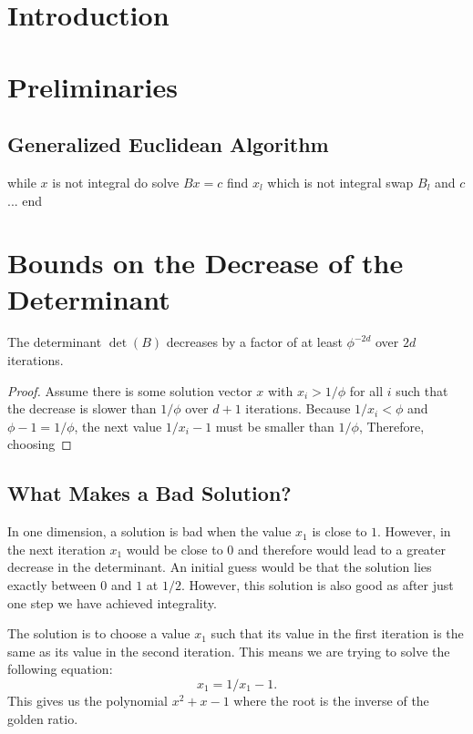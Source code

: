 \documentclass[english,version-2020-11]{uzl-thesis}
\begin{document}
\chapter{Introduction}

\chapter{Preliminaries}

\section{Generalized Euclidean Algorithm}

\begin{Pseudocode}
while $x$ is not integral do
  solve $Bx = c$
  find $x_l$ which is not integral
  swap $B_l$ and $c$
  ...
end
\end{Pseudocode}

\chapter{Bounds on the Decrease of the Determinant}

\begin{theorem}
  The determinant $\det(B)$ decreases by a factor of at least $\phi^{-2d}$ over
  $2d$ iterations.
\end{theorem}

\begin{proof}
  Assume there is some solution vector $x$ with $x_i > 1/\phi$ for all $i$
  such that the decrease is slower than $1/\phi$ over $d+1$ iterations.
  Because $1/x_i < \phi$ and $\phi - 1 = 1/\phi$,
  the next value $1/x_i - 1$ must be smaller than $1/\phi$,
  Therefore, choosing
\end{proof}

\section{What Makes a Bad Solution?}

In one dimension, a solution is bad when the value $x_1$ is close to $1$.
However, in the next iteration $x_1$ would be close to $0$ and therefore
would lead to a greater decrease in the determinant.
An initial guess would be that the solution lies exactly between $0$ and $1$ at $1/2$.
However, this solution is also good as after just one step we have achieved integrality.

The solution is to choose a value $x_1$ such that its value in the first
iteration is the same as its value in the second iteration.
This means we are trying to solve the following equation:
\[
  x_1 = 1/x_1 - 1.
\]
This gives us the polynomial $x^2 + x - 1$ where the root is the inverse of the
golden ratio.
\end{document}
